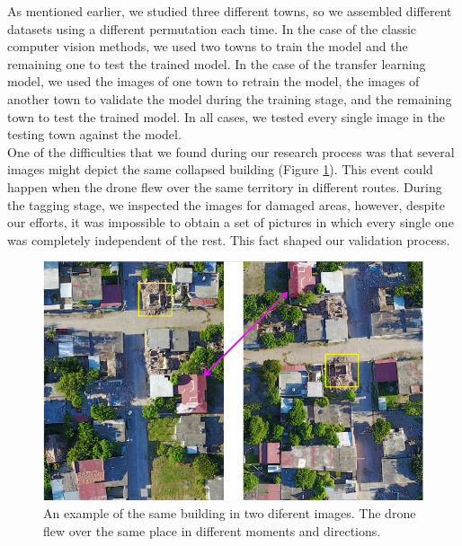 As mentioned earlier, we studied three different towns, so we assembled different datasets using a different permutation each time. In the case of the classic computer vision methods, we used two towns to train the model and the remaining one to test the trained model. In the case of the transfer learning model, we used the images of one town to retrain the model, the images of another town to validate the model during the training stage, and the remaining town to test the trained model. In all cases, we tested every single image in the testing town against the model.\\

One of the difficulties that we found during our research process was that several images might depict the same collapsed building (Figure \ref{fig:compare}). This event could happen when the drone flew over the same territory in different routes. During the tagging stage, we inspected the images for damaged areas, however, despite our efforts, it was impossible to obtain a set of pictures in which every single one was completely independent of the rest. This fact shaped our validation process.\\

\begin{figure}[!ht]
  \centering
  \includegraphics[width=1\textwidth]{images/compare.jpg}
  \caption{An example of the same building in two diferent images. The drone flew over the same place in different moments and directions.}
  \label{fig:compare}
\end{figure}

